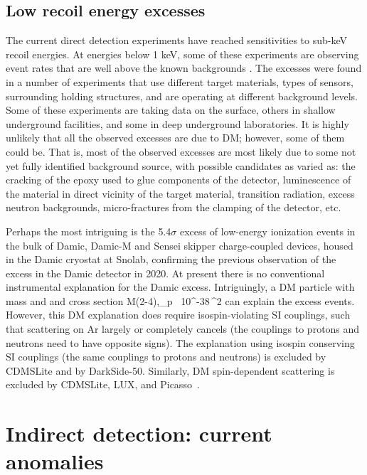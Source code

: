 \subsection{Low recoil energy excesses}\label{sec:low:energy:DD:excess}
The current direct detection experiments have reached sensitivities to sub-keV recoil energies.  At energies below 1 keV, some of these experiments are observing event rates that are well above the known backgrounds \cite{Low:energy:excesses}. The excesses were found in a number of experiments that use different target materials, types of sensors, surrounding holding structures, and are operating at different background levels. Some of these experiments are taking data on the surface, others in shallow underground facilities, and some in deep underground laboratories. It is highly unlikely that all the observed excesses are due to DM; 
however, some of them could be. That is, most of the observed excesses are most likely due to some not yet fully identified background source, with possible candidates as varied as: the cracking of the epoxy used to glue components of the detector, luminescence of the material in direct vicinity of the target material, transition radiation, excess neutron backgrounds, micro-fractures from the clamping of the detector, etc. 

\medskip 
Perhaps the most intriguing is the 5.4$\sigma$ excess of low-energy ionization events in the bulk of {\sc Damic}, {\sc Damic-M} and {\sc Sensei} skipper charge-coupled devices, housed in the {\sc Damic} cryostat at {\sc Snolab}, confirming the previous observation of the excess in the {\sc Damic} detector in 2020. At present there is no conventional instrumental explanation for the {\sc Damic} excess. Intriguingly, a DM particle with mass and
and cross section
\beq M\approx (2-4)\GeV,\qquad  \sigma_p\approx {}~ 10^{-38}\,^2\eeq 
can explain the excess events. However, this DM explanation does require isospin-violating SI couplings, 
such that scattering on Ar largely or completely cancels
(the couplings to protons and neutrons need to have opposite signs). The explanation using isospin conserving SI couplings (the same couplings to protons and neutrons) is excluded by CDMSLite and by DarkSide-50. Similarly, DM spin-dependent  scattering is excluded by CDMSLite, LUX, and {\sc Picasso}~\cite{Low:energy:excesses}. 


\section{Indirect detection: current anomalies}\label{sec:IDanom}

